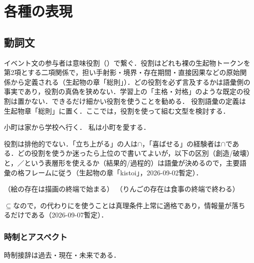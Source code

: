 \documentclass[../../main-detail.tex]{subfiles}
\begin{document}
\chapter{各種の表現}\label{chap:practice-expressions}
\section{動詞文}
イベント文の参与者は意味役割（）で繋ぐ．役割はどれも裸の生起物トークンを第2項とする二項関係で，担い手射影・境界・存在期間・直接因果などの原始関係から定義される（生起物の章「総則」）．どの役割を必ず言及するかは語彙側の事実であり，役割の真偽を狭めない．学習上の「主格・対格」のような既定の役割は置かない．できるだけ細かい役割を使うことを勧める．
役割語彙の定義は生起物章「総則」に置く．ここでは，役割を使って組む文型を検討する．
\begin{exe}
 \ex {}\hfill 小町は家から学校へ行く．
 \ex {}\hfill 私は小町を愛する．
\end{exe}
役割は排他的でない．「立ち上がる」の人は$\cap$，「喜ばせる」の経験者は$\cap$である．どの役割を使うか迷ったら上位ので書いてよいが，以下の区別（創造/破壊）と，／という表層形を使えるか（結果的/過程的）は語彙が決めるので，主要語彙の格フレームに従う（生起物の章「kistoi」，2026-09-02暫定）．
\begin{exe}
    \ex {}\hfill {}（絵の存在は描画の終端で始まる）
    \ex {}\hfill {}（りんごの存在は食事の終端で終わる）
\end{exe}
$\subseteq$なので，の代わりにを使うことは真理条件上常に適格であり，情報量が落ちるだけである（2026-09-07暫定）．

\subsection{時制とアスペクト}
時制接辞は過去・現在・未来である．
\begin{exe}
    \ex {}\hfill {}
\end{exe}
\end{document}
